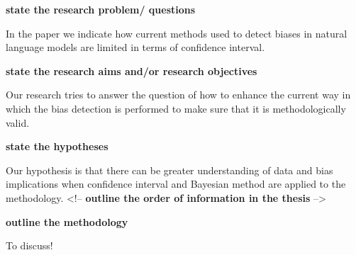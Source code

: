 \documentclass[]{book}
\begin{document}
\textbf{state the research problem/ questions}

In the paper we indicate how current methods used to detect biases in
natural language models are limited in terms of confidence interval.
\newline

\textbf{state the research aims and/or research objectives}

Our research tries to answer the question of how to enhance the current
way in which the bias detection is performed to make sure that it is
methodologically valid. \newline

\textbf{state the hypotheses}

Our hypothesis is that there can be greater understanding of data and
bias implications when confidence interval and Bayesian method are
applied to the methodology. \newline
<!-- \textbf{outline the order of information in the thesis} -->

\textbf{outline the methodology}

To discuss!
\end{document}
